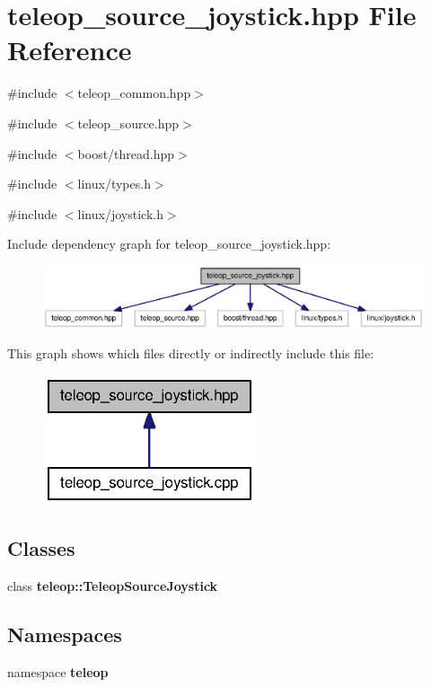 \section{teleop\_\-source\_\-joystick.hpp File Reference}
\label{teleop__source__joystick_8hpp}
{\ttfamily \#include $<$teleop\_\-common.hpp$>$}\par
{\ttfamily \#include $<$teleop\_\-source.hpp$>$}\par
{\ttfamily \#include $<$boost/thread.hpp$>$}\par
{\ttfamily \#include $<$linux/types.h$>$}\par
{\ttfamily \#include $<$linux/joystick.h$>$}\par
Include dependency graph for teleop\_\-source\_\-joystick.hpp:
\nopagebreak
\begin{figure}[H]
\begin{center}
\leavevmode
\includegraphics[width=400pt]{teleop__source__joystick_8hpp__incl}
\end{center}
\end{figure}
This graph shows which files directly or indirectly include this file:
\nopagebreak
\begin{figure}[H]
\begin{center}
\leavevmode
\includegraphics[width=178pt]{teleop__source__joystick_8hpp__dep__incl}
\end{center}
\end{figure}
\subsection*{Classes}
\begin{DoxyCompactItemize}
\item 
class {\bf teleop::TeleopSourceJoystick}
\end{DoxyCompactItemize}
\subsection*{Namespaces}
\begin{DoxyCompactItemize}
\item 
namespace {\bf teleop}
\end{DoxyCompactItemize}
